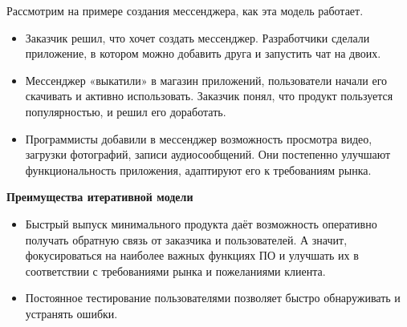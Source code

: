 \documentclass[a4paper]{article}
\begin{document}
\begin{figure}[h]
\end{figure}

Рассмотрим на примере создания мессенджера, как эта модель работает.
\begin{itemize}
    \item Заказчик решил, что хочет создать мессенджер. Разработчики сделали приложение, в котором можно добавить друга и запустить чат на двоих.
    \item Мессенджер «выкатили» в магазин приложений, пользователи начали его скачивать и активно использовать. Заказчик понял, что продукт пользуется популярностью, и решил его доработать.
    \item Программисты добавили в мессенджер возможность просмотра видео, загрузки фотографий, записи аудиосообщений. Они постепенно улучшают функциональность приложения, адаптируют его к требованиям рынка.
\end{itemize}

\noindent\textbf{Преимущества итеративной модели}
\begin{itemize}
  \item Быстрый выпуск минимального продукта даёт возможность оперативно получать обратную связь от заказчика и пользователей. А значит, фокусироваться на наиболее важных функциях ПО и улучшать их в соответствии с требованиями рынка и пожеланиями клиента.
  \item Постоянное тестирование пользователями позволяет быстро обнаруживать и устранять ошибки.
\end{itemize}
\end{document}
